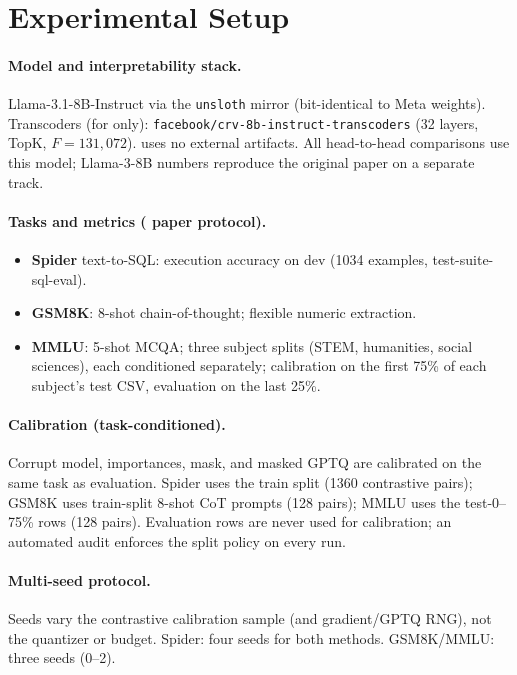 \section{Experimental Setup}
\label{sec:setup}

\paragraph{Model and interpretability stack.}
Llama-3.1-8B-Instruct via the \texttt{unsloth} mirror (bit-identical to Meta
weights). Transcoders (for \method{} only):
\texttt{facebook/crv-8b-instruct-transcoders} (32 layers, TopK,
$F{=}131{,}072$). \methodfree{} uses no external artifacts. All head-to-head
comparisons use this model; Llama-3-8B \baseline{} numbers reproduce the
original paper on a separate track.

\paragraph{Tasks and metrics (\baseline{} paper protocol).}
\begin{itemize}
  \item \textbf{Spider} text-to-SQL: execution accuracy on dev (1034 examples,
        test-suite-sql-eval).
  \item \textbf{GSM8K}: 8-shot chain-of-thought; flexible numeric extraction.
  \item \textbf{MMLU}: 5-shot MCQA; three subject splits (STEM, humanities,
        social sciences), each conditioned separately; calibration on the
        first 75\% of each subject's test CSV, evaluation on the last 25\%.
\end{itemize}

\paragraph{Calibration (task-conditioned).}
Corrupt model, importances, mask, and masked GPTQ are calibrated on the same
task as evaluation. Spider uses the train split (1360 contrastive pairs);
GSM8K uses train-split 8-shot CoT prompts (128 pairs); MMLU uses the
test-0--75\% rows (128 pairs). Evaluation rows are never used for calibration;
an automated audit enforces the split policy on every run.

\paragraph{Multi-seed protocol.}
Seeds vary the contrastive calibration sample (and gradient/GPTQ RNG), not the
quantizer or budget. Spider: four seeds for both methods. GSM8K/MMLU: three
seeds (0--2).

